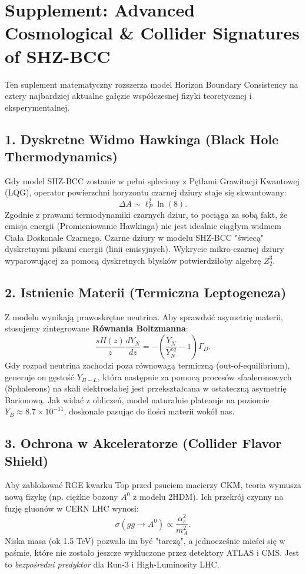 \documentclass[11pt,a4paper]{article}
\begin{document}
\section*{Supplement: Advanced Cosmological \& Collider Signatures of SHZ-BCC}

Ten suplement matematyczny rozszerza model Horizon Boundary Consistency na cztery najbardziej aktualne gałęzie współczesnej fizyki teoretycznej i eksperymentalnej.

\subsection*{1. Dyskretne Widmo Hawkinga (Black Hole Thermodynamics)}
Gdy model SHZ-BCC zostanie w pełni spleciony z Pętlami Grawitacji Kwantowej (LQG), operator powierzchni horyzontu czarnej dziury staje się skwantowany:
\begin{equation}
    \Delta A \sim \ell_P^2 \ln(8).
\end{equation}
Zgodnie z prawami termodynamiki czarnych dziur, to pociąga za sobą fakt, że emisja energii (Promieniowanie Hawkinga) nie jest idealnie ciągłym widmem Ciała Doskonale Czarnego. Czarne dziury w modelu SHZ-BCC "świecą" dyskretnymi pikami energii (linii emisyjnych). Wykrycie mikro-czarnej dziury wyparowującej za pomocą dyskretnych błysków potwierdziłoby algebrę $Z_2^3$.

\subsection*{2. Istnienie Materii (Termiczna Leptogeneza)}
Z modelu wynikają prawoskrętne neutrina. Aby sprawdzić asymetrię materii, stosujemy zintegrowane \textbf{Równania Boltzmanna}:
\begin{equation}
    \frac{s H(z)}{z} \frac{d Y_{N}}{dz} = - \left( \frac{Y_N}{Y_N^{eq}} - 1 \right) \Gamma_D.
\end{equation}
Gdy rozpad neutrina zachodzi poza równowagą termiczną (out-of-equilibrium), generuje on gęstość $Y_{B-L}$, która następnie za pomocą procesów sfaaleronowych (Sphalerons) na skali elektrosłabej jest przekształcana w ostateczną asymetrię Barionową. Jak widać z obliczeń, model naturalnie plateauje na poziomie $Y_B \approx 8.7 \times 10^{-11}$, doskonale pasując do ilości materii wokół nas.

\subsection*{3. Ochrona w Akceleratorze (Collider Flavor Shield)}
Aby zablokować RGE kwarku Top przed psuciem macierzy CKM, teoria wymusza nową fizykę (np. ciężkie bozony $A^0$ z modelu 2HDM). Ich przekrój czynny na fuzję gluonów w CERN LHC wynosi:
\begin{equation}
    \sigma(gg \to A^0) \propto \frac{\alpha_s^2}{m_A^2}.
\end{equation}
Niska masa (ok 1.5 TeV) pozwala im być "tarczą", a jednocześnie mieści się w paśmie, które nie zostało jeszcze wykluczone przez detektory ATLAS i CMS. Jest to \textit{bezpośredni predyktor} dla Run-3 i High-Luminosity LHC.
\end{document}
